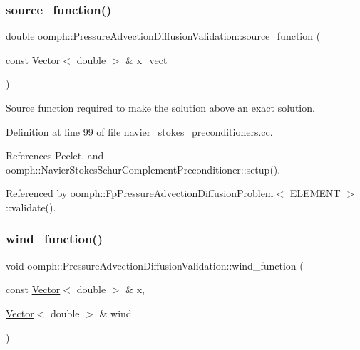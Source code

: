 \subsubsection{\texorpdfstring{source\+\_\+function()}{source\_function()}}
{\footnotesize\ttfamily double oomph\+::\+Pressure\+Advection\+Diffusion\+Validation\+::source\+\_\+function (\begin{DoxyParamCaption}\item[{const \hyperlink{classoomph_1_1Vector}{Vector}$<$ double $>$ \&}]{x\+\_\+vect }\end{DoxyParamCaption})}



Source function required to make the solution above an exact solution. 



Definition at line 99 of file navier\+\_\+stokes\+\_\+preconditioners.\+cc.



References Peclet, and oomph\+::\+Navier\+Stokes\+Schur\+Complement\+Preconditioner\+::setup().



Referenced by oomph\+::\+Fp\+Pressure\+Advection\+Diffusion\+Problem$<$ E\+L\+E\+M\+E\+N\+T $>$\+::validate().

\mbox{\label{namespaceoomph_1_1PressureAdvectionDiffusionValidation_a7bb38b47b4d4efe2e775baf918dda476}} 
\subsubsection{\texorpdfstring{wind\+\_\+function()}{wind\_function()}}
{\footnotesize\ttfamily void oomph\+::\+Pressure\+Advection\+Diffusion\+Validation\+::wind\+\_\+function (\begin{DoxyParamCaption}\item[{const \hyperlink{classoomph_1_1Vector}{Vector}$<$ double $>$ \&}]{x,  }\item[{\hyperlink{classoomph_1_1Vector}{Vector}$<$ double $>$ \&}]{wind }\end{DoxyParamCaption})}



